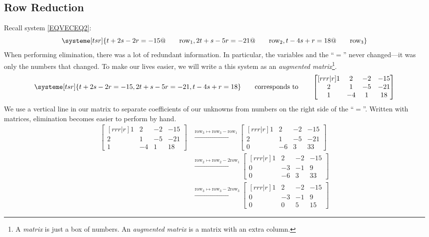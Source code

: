 \subsection{Row Reduction}
	Recall system \eqref{EQVECEQ2}:
	\[
		\systeme[tsr]{
			t+2s-2r=-15@\qquad\text{row}_1,
			2t+s-5r=-21@\qquad\text{row}_2,
			t-4s+r=18@\qquad\text{row}_3
		}
	\]
	When performing elimination, there was a lot of redundant information. 
	In particular, the variables and the ``$=$'' never changed---it was
	only the numbers that changed. To make our lives easier, we will
	write a this system as an \emph{augmented matrix}\footnote{
	A \emph{matrix} is just a box of numbers. An \emph{augmented matrix} is a matrix
	with an extra column.
	}.
	\[
		\systeme[tsr]{
			t+2s-2r=-15,
			2t+s-5r=-21,
			t-4s+r=18
		}\qquad\text{corresponds to}\qquad
		\begin{bmatrix}[rrr|r]
			1&2&-2 & -15\\
			2&1&-5&-21\\
			1&-4&1&18
		\end{bmatrix}
	\]
	We use a vertical line in our matrix to separate coefficients of our unknowns
	from numbers on the right side of the ``$=$''. Written with matrices, elimination
	becomes easier to perform by hand.
	\begin{align*}
		\begin{bmatrix}[rrr|r]
			1&2&-2 & -15\\
			2&1&-5&-21\\
			1&-4&1&18
		\end{bmatrix}
		&\xrightarrow{\text{row}_3\mapsto\text{row}_3-\text{row}_1}
		\begin{bmatrix}[rrr|r]
			1&2&-2 & -15\\
			2&1&-5&-21\\
			0&-6&3&33
		\end{bmatrix}\\
		&\xrightarrow{\text{row}_2\mapsto\text{row}_2-2\text{row}_1}
		\begin{bmatrix}[rrr|r]
			1&2&-2 & -15\\
			0&-3&-1&9\\
			0&-6&3&33
		\end{bmatrix}\\
		&\xrightarrow{\text{row}_3\mapsto\text{row}_3-2\text{row}_3}
		\begin{bmatrix}[rrr|r]
			1&2&-2 & -15\\
			0&-3&-1&9\\
			0&0&5&15
		\end{bmatrix}
	\end{align*}
